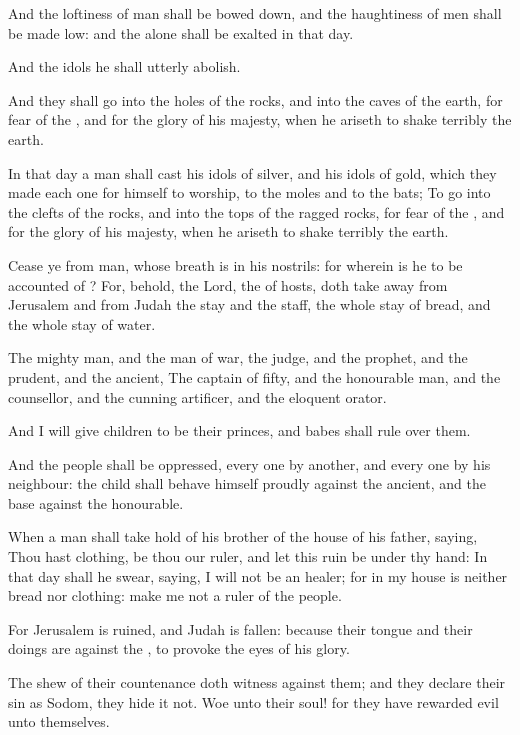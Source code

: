 \Verse And the loftiness of man shall be bowed down, and the haughtiness of men shall be made low: and the \LORD alone shall be exalted in that day.

\Verse And the idols he shall utterly abolish.

\Verse And they shall go into the holes of the rocks, and into the caves of the earth, for fear of the \LORD, and for the glory of his majesty, when he ariseth to shake terribly the earth.

\Verse In that day a man shall cast his idols of silver, and his idols of gold, which they made each one for himself to worship, to the moles and to the bats; \Verse To go into the clefts of the rocks, and into the tops of the ragged rocks, for fear of the \LORD, and for the glory of his majesty, when he ariseth to shake terribly the earth.

\Verse Cease ye from man, whose breath is in his nostrils: for wherein is he to be accounted of ?  
\Chapter
\Verse For, behold, the Lord, the \LORD of hosts, doth take away from Jerusalem and from Judah the stay and the staff, the whole stay of bread, and the whole stay of water.

\Verse The mighty man, and the man of war, the judge, and the prophet, and the prudent, and the ancient, \Verse The captain of fifty, and the honourable man, and the counsellor, and the cunning artificer, and the eloquent orator.

\Verse And I will give children to be their princes, and babes shall rule over them.

\Verse And the people shall be oppressed, every one by another, and every one by his neighbour: the child shall behave himself proudly against the ancient, and the base against the honourable.

\Verse When a man shall take hold of his brother of the house of his father, saying, Thou hast clothing, be thou our ruler, and let this ruin be under thy hand: \Verse In that day shall he swear, saying, I will not be an healer; for in my house is neither bread nor clothing: make me not a ruler of the people.

\Verse For Jerusalem is ruined, and Judah is fallen: because their tongue and their doings are against the \LORD, to provoke the eyes of his glory.

\Verse The shew of their countenance doth witness against them; and they declare their sin as Sodom, they hide it not. Woe unto their soul! for they have rewarded evil unto themselves.

